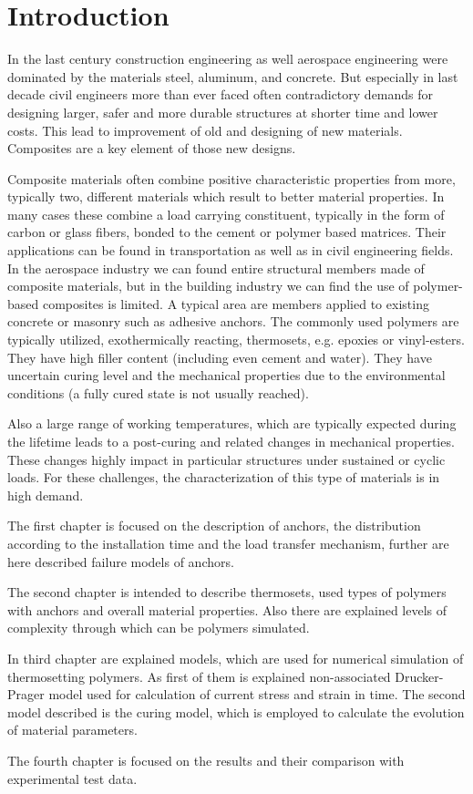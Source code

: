 \section*{Introduction}
\indent

In the last century construction engineering as well aerospace engineering  were dominated by the materials steel, aluminum, and concrete. But especially in last decade civil engineers more than ever faced often contradictory demands for designing larger, safer and more durable structures at shorter time and lower costs. This lead to improvement of old and designing of new materials. Composites are a key element of those new designs.

Composite materials often combine positive characteristic properties from more, typically two, different materials which result to better material properties. In many cases these combine a load carrying constituent, typically in the form of carbon or glass fibers, bonded to the cement or polymer based matrices. Their applications can be found in transportation as well as in civil engineering fields. In the aerospace industry we can found entire structural members made of composite materials, but in the building industry we can find the use of polymer-based composites is limited. A typical area are members applied to existing concrete or masonry such as adhesive anchors. The commonly used polymers are typically utilized, exothermically reacting, thermosets, e.g. epoxies or vinyl-esters. They have high filler content (including even cement and water). They have uncertain curing level and the mechanical properties due to the environmental conditions (a fully cured state is not usually reached).

Also a large range of working temperatures, which are typically expected during the lifetime leads to a post-curing and related changes in mechanical properties. These changes highly impact in particular structures under sustained or cyclic loads. For these challenges, the characterization of this type of materials is in high demand.  

The first chapter is focused on the description of anchors, the distribution according to the installation time and the load transfer mechanism, further are here described failure models of anchors.

The second chapter is intended to describe thermosets, used types of polymers with anchors and overall material properties. Also there are explained levels of complexity through which can be polymers simulated. 

In third chapter are explained models, which are used for numerical simulation of thermosetting polymers. As first of them is explained non-associated Drucker-Prager model used for calculation of current stress and strain in time. The second model described is the curing model, which is employed to calculate the evolution of material parameters.

The fourth chapter is focused on the results and their comparison with experimental test data.


